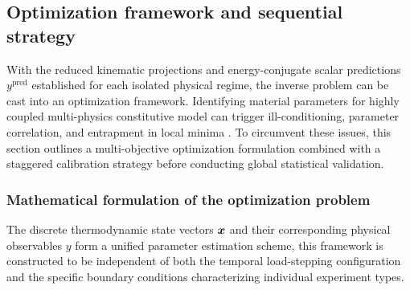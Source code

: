 \subsection{Optimization framework and sequential strategy}
\label{sec:optim_framework}

With the reduced kinematic projections and energy-conjugate scalar predictions $y^{\text{pred}}$ established for each isolated physical regime, the inverse problem can be cast into an optimization framework. Identifying material parameters for highly coupled multi-physics constitutive model can trigger ill-conditioning, parameter correlation, and entrapment in local minima \cite{Tarantola_Inverse}. To circumvent these issues, this section outlines a multi-objective optimization formulation combined with a staggered calibration strategy before conducting global statistical validation.


\subsubsection{Mathematical formulation of the optimization problem}
\label{sec:optim_problem}

The discrete thermodynamic state vectors $\boldsymbol{x}$ and their corresponding physical observables $y$ form a unified parameter estimation scheme, this framework is constructed to be independent of both the temporal load-stepping configuration and the specific boundary conditions characterizing individual experiment types.


